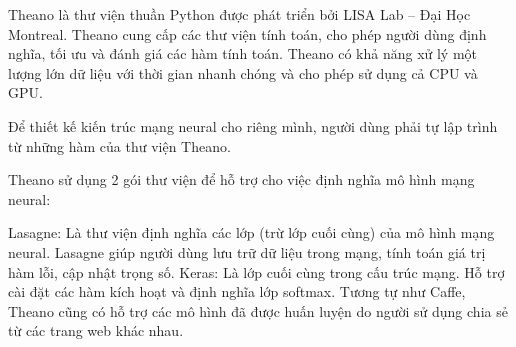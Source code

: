 Theano là thư viện thuần Python được phát triển bởi LISA Lab – Đại Học Montreal. Theano cung cấp các thư viện tính toán, cho phép người dùng định nghĩa, tối ưu và đánh giá các hàm tính toán. Theano có khả năng xử lý một lượng lớn dữ liệu với thời gian nhanh chóng và cho phép sử dụng cả CPU và GPU.

Để thiết kế kiến trúc mạng neural cho riêng mình, người dùng phải tự lập trình từ những hàm của thư viện Theano.

Theano sử dụng 2 gói thư viện để hỗ trợ cho việc định nghĩa mô hình mạng neural:

Lasagne: Là thư viện định nghĩa các lớp (trừ lớp cuối cùng) của mô hình mạng neural. Lasagne giúp người dùng lưu trữ dữ liệu trong mạng, tính toán giá trị hàm lỗi, cập nhật trọng số.
Keras: Là lớp cuối cùng trong cấu trúc mạng. Hỗ trợ cài đặt các hàm kích hoạt và định nghĩa lớp softmax.
Tương tự như Caffe, Theano cũng có hỗ trợ các mô hình đã được huấn luyện do người sử dụng chia sẻ từ các trang web khác nhau.